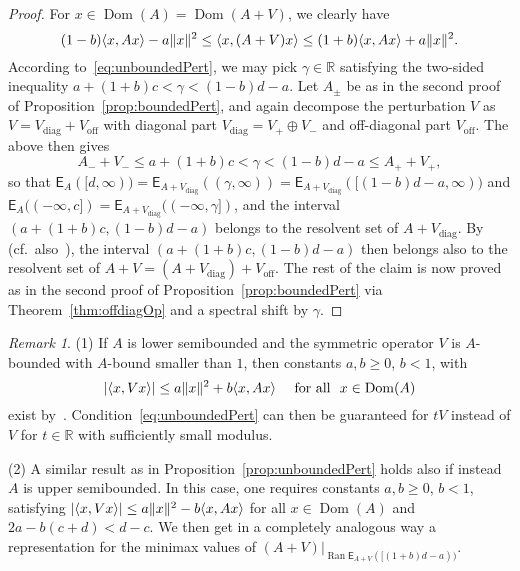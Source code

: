 \documentclass[11pt,a4paper]{amsart}
\numberwithin{equation}{section}
\DeclareMathOperator{\Ran}{Ran}
\DeclareMathOperator{\Dom}{Dom}
\DeclarePairedDelimiter{\abs}{|}{|}
\DeclarePairedDelimiter{\norm}{\lVert}{\rVert}
\DeclarePairedDelimiter{\scprod}{\langle}{\rangle}
\newcommand{\RR}{\mathbb{R}}
\newcommand{\EE}{\mathsf{E}}
\theoremstyle{plain}
\theoremstyle{definition}
\theoremstyle{remark}
\newtheorem{remark}[theorem]{Remark}
\begin{document}
\begin{proof}
  For $x \in \Dom(A) = \Dom(A+V)$, we clearly have
  \begin{equation*}
    (1-b)\scprod{ x , Ax } - a\norm{x}^2
    \le
    \scprod{ x , (A+V)x }
    \le
    (1+b)\scprod{ x , Ax } + a\norm{x}^2
    .
  \end{equation*}
  According to~\eqref{eq:unboundedPert}, we may pick $\gamma \in \RR$ satisfying the two-sided inequality
  $a + (1+b)c < \gamma < (1-b)d - a$. Let $A_\pm$ be as in the second proof of Proposition~\ref{prop:boundedPert}, and again
  decompose the perturbation $V$ as $V = V_\text{diag} + V_\text{off}$ with diagonal part $V_\text{diag} = V_+ \oplus V_-$
  and off-diagonal part $V_\text{off}$. The above then gives
  \begin{equation*}
    A_- + V_-
    \le
    a + (1+b)c
    <
    \gamma
    <
    (1-b)d - a
    \le
    A_+ + V_+
    ,
  \end{equation*}
  so that $\EE_A([d,\infty)) = \EE_{A+V_\text{diag}}((\gamma,\infty)) = \EE_{A+V_\text{diag}}([(1-b)d-a,\infty))$ and
  $\EE_A((-\infty,c]) = \EE_{A+V_\text{diag}}((-\infty,\gamma])$, and the interval $(a + (1+b)c , (1-b)d - a)$ belongs to the
  resolvent set of $A+V_\text{diag}$. By~\cite[Theorem~1]{MS06} (cf.~also~\cite[Theorem~2.1]{AL95}), the interval
  $(a + (1+b)c , (1-b)d - a)$ then belongs also to the resolvent set of $A + V = (A+V_\text{diag}) + V_\text{off}$. The rest of
  the claim is now proved as in the second proof of Proposition~\ref{prop:boundedPert} via Theorem~\ref{thm:offdiagOp} and a
  spectral shift by $\gamma$.
\end{proof}%

\begin{remark}\label{rem:unboundedPert}
  (1)
  If $A$ is lower semibounded and the symmetric operator $V$ is $A$-bounded with $A$-bound smaller than $1$, then constants
  $a, b \ge 0$, $b < 1$, with
  \begin{equation*}
    \abs{ \scprod{ x , Vx } }
    \le
    a\norm{x}^2 + b \scprod{ x , Ax }
    \quad\text{ for all }\
    x \in \Dom(A)
  \end{equation*}
  exist by~\cite[Theorem~VI.1.38]{Kato95}. Condition~\eqref{eq:unboundedPert} can then be guaranteed for $tV$ instead of $V$ for
  $t \in \RR$ with sufficiently small modulus.

  (2)
  A similar result as in Proposition~\ref{prop:unboundedPert} holds also if instead $A$ is upper semibounded. In this case, one
  requires constants $a, b \ge 0$, $b < 1$, satisfying $\abs{ \scprod{ x , Vx } } \le a\norm{x}^2 - b \scprod{ x , Ax }$ for all
  $x \in \Dom(A)$ and $2a - b(c+d) < d-c$. We then get in a completely analogous way a representation for the minimax values of
  $(A+V)|_{\Ran\EE_{A+V}([(1+b)d-a))}$.
\end{remark}
\end{document}
